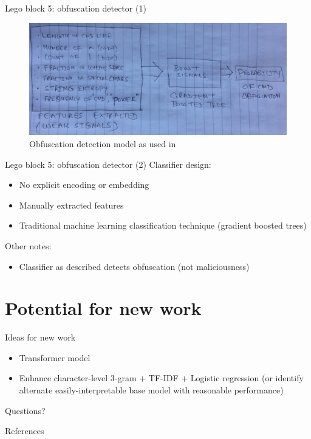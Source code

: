 \documentclass[10pt]{beamer}
\begin{document}
\begin{frame}{Lego block 5: obfuscation detector (1)}
	\begin{figure}
		\includegraphics[scale=0.50]{gbtree}
		\caption{Obfuscation detection model as used in \cite{feye2018}}
	\end{figure}
\end{frame}

\begin{frame}{Lego block 5: obfuscation detector (2)}
	Classifier design:
	\begin{itemize}
		\item No explicit encoding or embedding
		\item Manually extracted features
		\item Traditional machine learning classification technique (gradient boosted trees)
	\end{itemize}
	Other notes:
	\begin{itemize}
		\item Classifier as described detects obfuscation (not maliciousness)
	\end{itemize}
\end{frame}

\section{Potential for new work}

\begin{frame}[fragile]{Ideas for new work}
	\begin{itemize}
		\item Transformer model \cite{transformers2019}
		\item Enhance character-level 3-gram + TF-IDF + Logistic regression (or identify alternate easily-interpretable base model with reasonable performance)
	\end{itemize}
\end{frame}

\begin{frame}[standout]
  Questions?
\end{frame}

\appendix

\begin{frame}[allowframebreaks]{References}

  
  

\end{frame}
\end{document}
